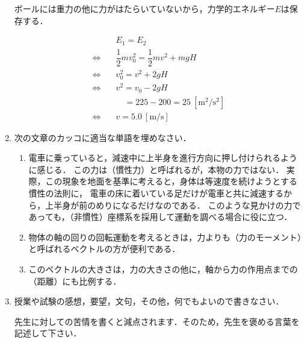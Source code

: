 \documentclass[a4paper,11pt]{ltjsarticle}
\begin{document}
\begin{enumerate}
    ボールには重力の他に力がはたらいていないから，力学的エネルギー$E$は保存する．

    \begin{equation*}
        \begin{aligned}
            & E_1 = E_2 \\
            \Leftrightarrow \quad & \dfrac{1}{2}mv_0^2 = \dfrac{1}{2}mv^2 + mgH \\
            \Leftrightarrow \quad & v_0^2 = v^2 + 2gH \\
            \Leftrightarrow \quad & v^2 = v_0 - 2gH \\
                                  & \quad = 225 - 200 = 25\ [\mathrm{m^2/s^2}] \\
            \Leftrightarrow \quad & v = 5.0\ [\mathrm{m/s}]
        \end{aligned}
    \end{equation*}

    \vspace{5pt}

    \item 次の文章のカッコに適当な単語を埋めなさい．
    
    \vspace{5pt}

    \begin{enumerate}[label=(\arabic*)]
        \item 電車に乗っていると，減速中に上半身を進行方向に押し付けられるように感じる．
        この力は（慣性力）と呼ばれるが，本物の力ではない．
        実際，この現象を地面を基準に考えると，身体は等速度を続けようとする慣性の法則に，
        電車の床に着いている足だけが電車と共に減速するから，上半身が前のめりになるだけなのである．
        このような見かけの力であっても，（非慣性）座標系を採用して運動を調べる場合に役に立つ．

        \item 物体の軸の回りの回転運動を考えるときは，力よりも（力のモーメント）と呼ばれるベクトルの方が便利である．
        \item このベクトルの大きさは，力の大きさの他に，軸から力の作用点までの（距離）にも比例する．
    \end{enumerate}

    \vspace{5pt}

    \item 授業や試験の感想，要望，文句，その他，何でもよいので書きなさい．

    \vspace{5pt}

    先生に対しての苦情を書くと減点されます．そのため，先生を褒める言葉を記述して下さい．

    \vspace{5pt}

\end{enumerate}
\end{document}
